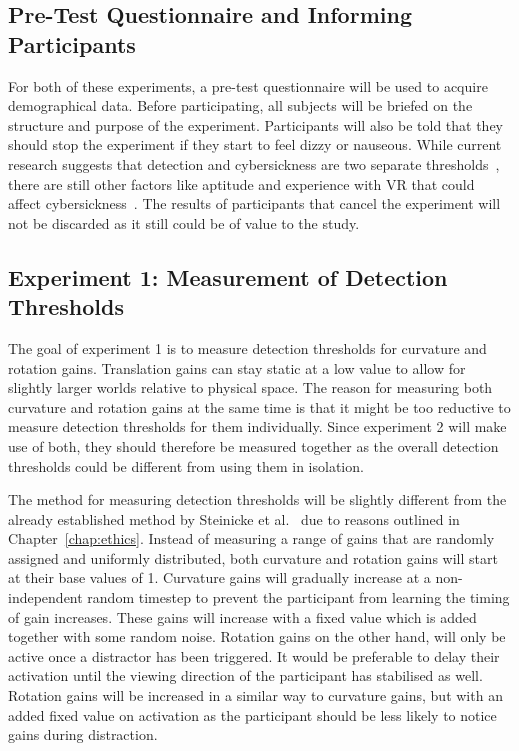 \subsection{Pre-Test Questionnaire and Informing Participants}
For both of these experiments, a pre-test questionnaire will be used to acquire demographical data. Before participating, all subjects will be briefed on the structure and purpose of the experiment. Participants will also be told that they should stop the experiment if they start to feel dizzy or nauseous. While current research suggests that detection and cybersickness are two separate thresholds~\cite{fuglestad2018redirected}, there are still other factors like aptitude and experience with VR that could affect cybersickness~\cite{hildebrandt2018get}. The results of participants that cancel the experiment will not be discarded as it still could be of value to the study. 

\subsection{Experiment 1: Measurement of Detection Thresholds}
The goal of experiment 1 is to measure detection thresholds for curvature and rotation gains. Translation gains can stay static at a low value to allow for slightly larger worlds relative to physical space. The reason for measuring both curvature and rotation gains at the same time is that it might be too reductive to measure detection thresholds for them individually. Since experiment 2 will make use of both, they should therefore be measured together as the overall detection thresholds could be different from using them in isolation.

The method for measuring detection thresholds will be slightly different from the already established method by Steinicke et al.~\cite{5072212} due to reasons outlined in Chapter~\ref{chap:ethics}. Instead of measuring a range of gains that are randomly assigned and uniformly distributed, both curvature and rotation gains will start at their base values of 1. Curvature gains will gradually increase at a non-independent random timestep to prevent the participant from learning the timing of gain increases. These gains will increase with a fixed value which is added together with some random noise. Rotation gains on the other hand, will only be active once a distractor has been triggered. It would be preferable to delay their activation until the viewing direction of the participant has stabilised as well. Rotation gains will be increased in a similar way to curvature gains, but with an added fixed value on activation as the participant should be less likely to notice gains during distraction.

